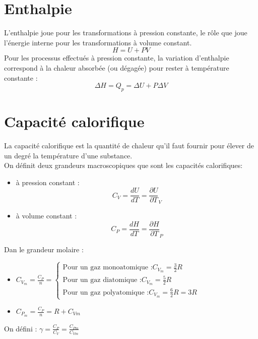 \documentclass[12pt,oneside]{book}
\begin{document}
\section{Enthalpie}
L'enthalpie joue pour les transformations à pression constante, le rôle que joue l'énergie interne pour les transformations à volume constant.
\[\boxed{H = U + PV}\]
Pour les processus effectués à pression constante, la variation d'enthalpie correspond à la chaleur absorbée (ou dégagée) pour rester à température constante :
\[\Delta H = Q_p = \Delta U + P\Delta V\]
\section{Capacité calorifique}
La capacité calorifique est la quantité de chaleur qu'il faut fournir pour élever de un degré la température d'une substance.\\
On définit deux grandeurs macroscopiques que sont les capacités calorifiques:
\begin{itemize}
    \item à pression constant :
          \[\boxed{C_V = \frac{dU}{dT} = \frac{\partial U}{\partial T}_V}\]
    \item à volume constant :
          \[\boxed{C_P =\frac{dH}{dT} =  \frac{\partial H}{\partial T}_P}\]
\end{itemize}
Dan le grandeur molaire :
\begin{itemize}
    \item $C_{V_m} = \frac{C_P}{n} = \begin{cases}
                  \text{Pour un gaz monoatomique :} C_{V_m} = \frac{3}{2}R \\
                  \text{Pour un gaz diatomique :} C_{V_m} = \frac{5}{2}R   \\
                  \text{Pour un gaz polyatomique :} C_{V_m} = \frac{6}{2}R = 3R
              \end{cases}$
    \item $C_{P_m} = \frac{C_P}{n} = R + C_{Vm}$
\end{itemize}
On défini : $\gamma = \frac{C_P}{C_V} = \frac{C_{Pm}}{C_{Vm}}$
\end{document}

